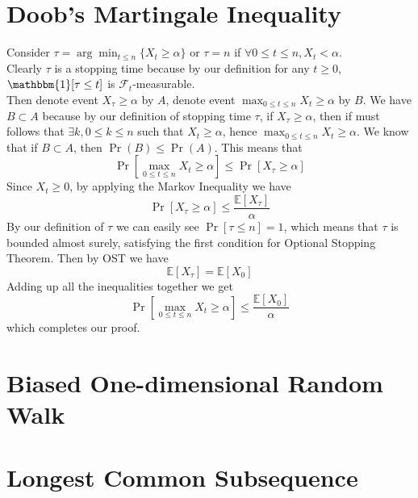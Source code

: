 \documentclass[12pt,letterpaper]{article}
\begin{document}
\section{Doob's Martingale Inequality}
Consider $\tau=\arg\min_{t\leq n}\{X_t\geq\alpha\}$ or $\tau=n$ if $\forall 0\leq t\leq n, X_t<\alpha$.\\
Clearly $\tau$ is a stopping time because by our definition 
for any $t\geq 0$, $\mathbbm{1}[\tau\leq t]$ is $\mathcal{F}_t$-measurable.\\
Then denote event $X_{\tau}\geq\alpha$ by $A$,
denote event $\max_{0\leq t\leq n}X_t\geq\alpha$ by $B$.
We have $B\subset A$ because by our definition of stopping time $\tau$,
if $X_{\tau}\geq\alpha$,
then if must follows that $\exists k, 0\leq k\leq n$ such that $X_t\geq\alpha$,
hence $\max_{0\leq t\leq n}X_t\geq\alpha$.
We know that if $B\subset A$, then $\Pr(B)\leq\Pr(A)$.
This means that
$$\Pr \left[\max_{0\leq t\leq n}X_t\geq\alpha\right]\leq \Pr\left[X_{\tau}\geq\alpha\right]$$
Since $X_t\geq 0$, by applying the Markov Inequality we have
$$\Pr\left[X_{\tau}\geq\alpha\right]\leq \frac{\mathbb{E}\left[X_{\tau}\right]}{\alpha}$$
By our definition of $\tau$ we can easily see $\Pr[\tau\leq n]=1$,
which means that $\tau$ is bounded almost surely,
satisfying the first condition for Optional Stopping Theorem.
Then by OST we have
$$\mathbb{E}[X_{\tau}]=\mathbb{E}[{X_0}]$$
Adding up all the inequalities together we get 
$$\Pr \left[\max_{0\leq t\leq n}X_t\geq\alpha\right]\leq \frac{\mathbb{E}\left[X_{0}\right]}{\alpha}$$
which completes our proof.

\section{Biased One-dimensional Random Walk}
\subsection{}

\subsection{}

\subsection{}

\section{Longest Common Subsequence}
\end{document}
